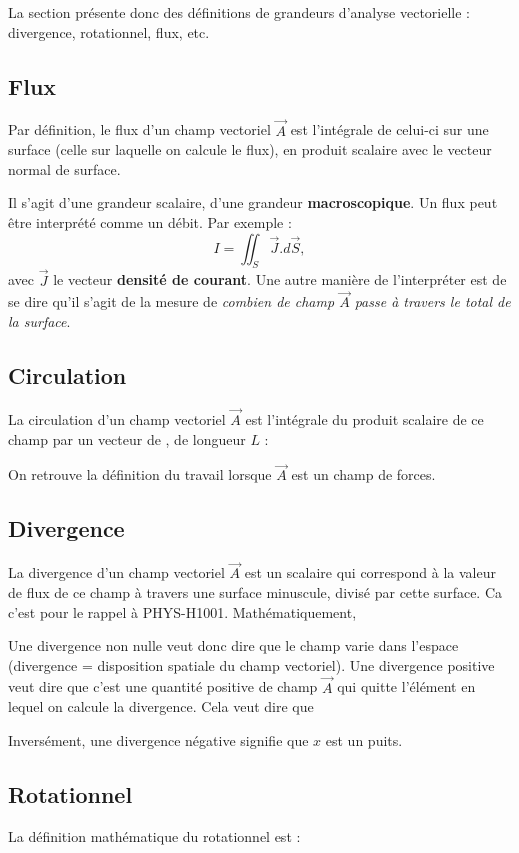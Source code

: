 \documentclass[12pt]{book}
\begin{document}
La section présente donc des définitions de grandeurs d'analyse vectorielle : divergence, rotationnel, flux, etc.
\subsection{Flux}
Par définition, le flux d'un champ vectoriel $\vec{A}$ est l'intégrale de celui-ci sur une surface (celle sur laquelle on calcule le flux), en produit scalaire avec le vecteur normal de surface.

Il s'agit d'une grandeur scalaire, d'une grandeur \textbf{macroscopique}. Un flux peut être interprété comme un débit. Par exemple : $$ I = \iint_S \vec{J}.d\vec{S}, $$ avec $\vec{J}$ le vecteur \textbf{densité de courant}. Une autre manière de l'interpréter est de se dire qu'il s'agit de la mesure de \textit{combien de champ $\vec{A}$ passe à travers le total de la surface}.
\subsection{Circulation}
La circulation d'un champ vectoriel $\vec{A}$ est l'intégrale du produit scalaire de ce champ par un vecteur de , de longueur $L$ :

On retrouve la définition du travail lorsque $\vec{A}$ est un champ de forces.
\subsection{Divergence}
La divergence d'un champ vectoriel $\vec{A}$ est un scalaire qui correspond à la valeur de flux de ce champ à travers une surface minuscule, divisé par cette surface. Ca c'est pour le rappel à PHYS-H1001. Mathématiquement, 


Une divergence non nulle veut donc dire que le champ varie dans l'espace (divergence = disposition spatiale du champ vectoriel). Une divergence positive veut dire que c'est une quantité positive de champ $\vec{A}$ qui quitte l'élément en lequel on calcule la divergence. Cela veut dire que

 Inversément, une divergence négative signifie que $x$ est un puits.

 \subsection{Rotationnel}
 La définition mathématique du rotationnel est :
 
\end{document}
